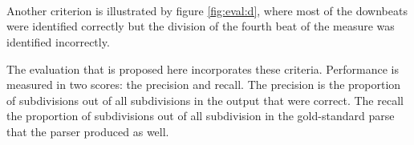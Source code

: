 \begin{figure}
\centering
{}
\\
\\
\\
\end{figure}

Another criterion is illustrated by figure \ref{fig:eval:d}, where most of the downbeats were identified correctly but the division of the fourth beat of the measure was identified incorrectly. 

The evaluation that is proposed here incorporates these criteria. Performance is measured in two scores: the precision and recall. The precision is the proportion of subdivisions out of all subdivisions in the output that were correct. The recall the proportion of subdivisions out of all subdivision in the gold-standard parse that the parser produced as well.



